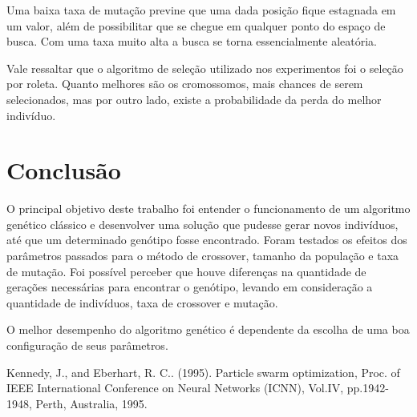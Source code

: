 \documentclass[conference]{IEEEtran}
\begin{document}
Uma baixa taxa de mutação previne que uma dada posição fique estagnada em um valor, além de possibilitar que se chegue em qualquer ponto do espaço de busca. Com uma taxa muito alta a busca se torna essencialmente aleatória.
    
Vale ressaltar que o algoritmo de seleção utilizado nos experimentos foi o seleção por roleta. Quanto melhores são os cromossomos, mais chances de serem selecionados, mas por outro lado, existe a probabilidade da perda do melhor indivíduo.

\section*{Conclusão}

O principal objetivo deste trabalho foi entender o funcionamento de um algoritmo genético clássico e desenvolver uma solução que pudesse gerar novos indivíduos, até que um determinado genótipo fosse encontrado. Foram testados os efeitos dos parâmetros passados para o método de crossover, tamanho da população e taxa de mutação. Foi possível perceber que houve diferenças na quantidade de gerações necessárias para encontrar o genótipo, levando em consideração a quantidade de indivíduos, taxa de crossover e mutação.

O melhor desempenho do algoritmo genético é dependente da escolha de uma boa configuração de seus parâmetros.


\begin{thebibliography}{00}

 Kennedy, J., and Eberhart, R. C.. (1995). Particle swarm optimization, Proc. of IEEE International Conference on Neural Networks (ICNN), Vol.IV, pp.1942-1948, Perth, Australia, 1995.
\end{thebibliography}
\vspace{12pt}
\end{document}
